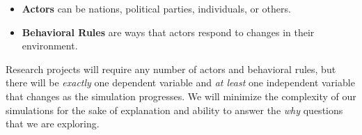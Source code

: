 \documentclass[titlepage, 12pt, leqno]{article}
\begin{document}
\begin{definition}
    \begin{itemize}
        \item \textbf{Actors} can be nations, political parties, individuals, or
            others.
        \item \textbf{Behavioral Rules} are ways that actors respond to changes 
            in their environment.
    \end{itemize}
\end{definition}

Research projects will require any number of actors and behavioral rules, but
there will be \textit{exactly} one dependent variable and \textit{at least} one
independent variable that changes as the simulation progresses. We will minimize
the complexity of our simulations for the sake of explanation and ability to
answer the \textit{why} questions that we are exploring.
\end{document}
